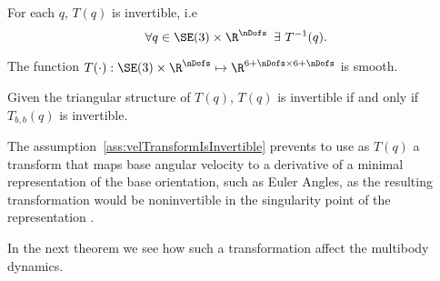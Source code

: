 \begin{assumption}
\label{ass:velTransformIsInvertible}
For each $q$, $T(q)$ is invertible, i.e $$\forall q \in \SE(3) \times \R^\nDofs \hspace{0.5em} \exists \  T^{-1}(q).$$
\end{assumption}
\begin{assumption}
\label{ass:velTransformIsSmooth}
The function $T(\cdot) : \SE(3) \times \R^{\nDofs} \mapsto \R^{6+\nDofs \times 6+\nDofs}$ is smooth.
\end{assumption}
\begin{remark}
Given the triangular structure of $T(q)$, $T(q)$ is invertible if and only if $T_{b,b}(q)$ is invertible. 
\end{remark}
\begin{remark}
The assumption~\ref{ass:velTransformIsInvertible} prevents to use as $T(q)$ a transform that maps base angular velocity to a derivative of a minimal representation of the base orientation, such as Euler Angles, as the resulting transformation would be noninvertible in the singularity point of the representation \citep{stuelpnagel1964}.
\end{remark}

In the next theorem we see how such a transformation affect the multibody dynamics.

